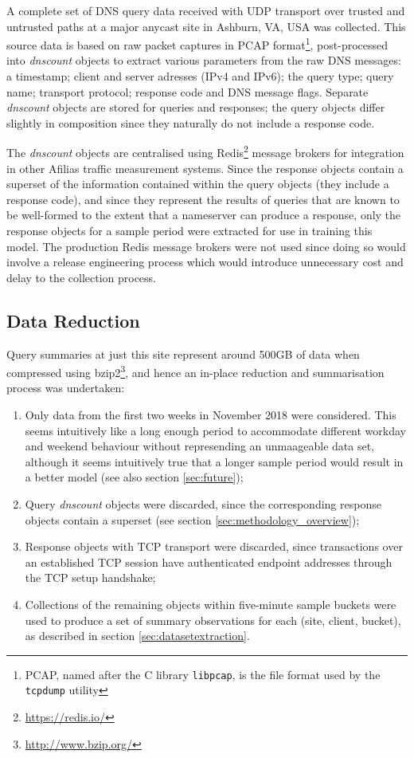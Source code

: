 \documentclass[conference]{IEEEtran}
\let\tightlist\relax %
\begin{document}
\label{sec:methodology_overview} A complete set of DNS query data
received with UDP transport over trusted and untrusted paths at a major
anycast site in Ashburn, VA, USA was collected. This source data is
based on raw packet captures in PCAP
format\footnote{PCAP, named after the C library \texttt{libpcap}, is the file format used by the \texttt{tcpdump} utility},
post-processed into \emph{dnscount} objects to extract various
parameters from the raw DNS messages: a timestamp; client and server
adresses (IPv4 and IPv6); the query type; query name; transport
protocol; response code and DNS message flags. Separate \emph{dnscount}
objects are stored for queries and responses; the query objects differ
slightly in composition since they naturally do not include a response
code.

The \emph{dnscount} objects are centralised using
Redis\footnote{\url{https://redis.io/}} message brokers for integration
in other Afilias traffic measurement systems. Since the response objects
contain a superset of the information contained within the query objects
(they include a response code), and since they represent the results of
queries that are known to be well-formed to the extent that a nameserver
can produce a response, only the response objects for a sample period
were extracted for use in training this model. The production Redis
message brokers were not used since doing so would involve a release
engineering process which would introduce unnecessary cost and delay to
the collection process.

\subsection{Data Reduction}\label{sec:data-reduction}

Query summaries at just this site represent around 500GB of data when
compressed using bzip2\footnote{\url{http://www.bzip.org/}}, and hence
an in-place reduction and summarisation process was undertaken:

\begin{enumerate}
\def\labelenumi{\arabic{enumi}.}
\tightlist
\item
  Only data from the first two weeks in November 2018 were considered.
  This seems intuitively like a long enough period to accommodate
  different workday and weekend behaviour without represending an
  unmaageable data set, although it seems intuitively true that a longer
  sample period would result in a better model (see also section
  \ref{sec:future});
\item
  Query \emph{dnscount} objects were discarded, since the corresponding
  response objects contain a superset (see section
  \ref{sec:methodology_overview});
\item
  Response objects with TCP transport were discarded, since transactions
  over an established TCP session have authenticated endpoint addresses
  through the TCP setup handshake;
\item
  Collections of the remaining objects within five-minute sample buckets
  were used to produce a set of summary observations for each (site,
  client, bucket), as described in section \ref{sec:datasetextraction}.
\end{enumerate}
\end{document}
